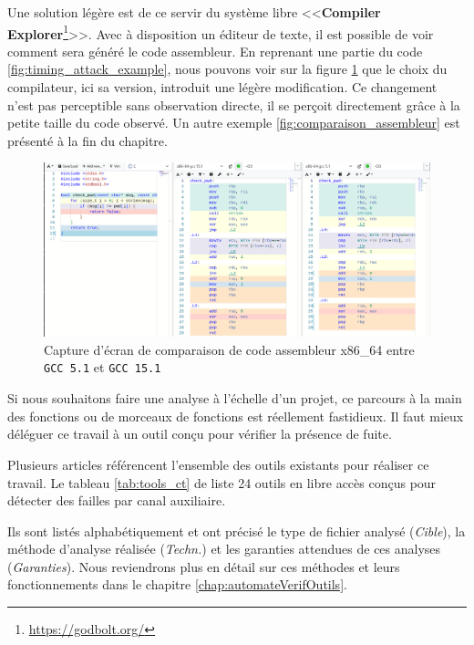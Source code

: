 Une solution légère est de ce servir du système libre <<\textbf{Compiler Explorer}\footnote{\url{https://godbolt.org/}}>>. Avec à disposition un éditeur de texte, il est possible de voir comment sera généré le code assembleur. En reprenant une partie du code \ref{fig:timing_attack_example}, nous pouvons voir sur la figure \ref{img:godbolt_example} que le choix du compilateur, ici sa version, introduit une légère modification. Ce changement n'est pas perceptible sans observation directe, il se perçoit directement grâce à la petite taille du code observé. Un autre exemple \ref{fig:comparaison_assembleur} est présenté à la fin du chapitre.

\begin{figure}[!h]
  \begin{adjustwidth}{-18mm}{0mm}
    \centering
    \includegraphics[trim = 1mm 0mm 0mm 0mm, clip,width=0.9\paperwidth]{pictures/godbolt_example.png}
    \caption{Capture d'écran de comparaison de code assembleur x86\_64 entre \texttt{GCC 5.1} et \texttt{GCC 15.1}}
    \label{img:godbolt_example}
  \end{adjustwidth}
\end{figure}

Si nous souhaitons faire une analyse à l'échelle d'un projet, ce parcours à la main des fonctions ou de morceaux de fonctions est réellement fastidieux. Il faut mieux déléguer ce travail à un outil conçu pour vérifier la présence de fuite.\smallbreak

Plusieurs articles référencent l'ensemble des outils existants \cite{notThatHardCT, GeimerEvaluationsSideChannel} pour réaliser ce travail. Le tableau \ref{tab:tools_ct} de \citeauthor{notThatHardCT} liste 24 outils en libre accès conçus pour détecter des failles par canal auxiliaire.

Ils sont listés alphabétiquement et ont précisé le type de fichier analysé (\textit{Cible}), la méthode d'analyse réalisée (\textit{Techn.}) et les garanties attendues de ces analyses (\textit{Garanties}). Nous reviendrons plus en détail sur ces méthodes et leurs fonctionnements dans le chapitre \ref{chap:automateVerifOutils}.\medbreak

